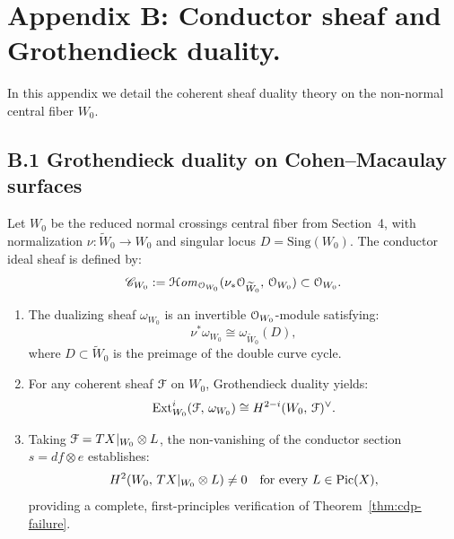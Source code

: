 \section*{Appendix B: Conductor sheaf and Grothendieck duality.}
\renewcommand{\thesection}{B}

In this appendix we detail the coherent sheaf duality theory on the non-normal central fiber $W_0$.

\subsection*{B.1 Grothendieck duality on Cohen--Macaulay surfaces}

Let $W_0$ be the reduced normal crossings central fiber from Section~4, with normalization $\nu \colon \widetilde W_0 \to W_0$ and singular locus $D = \mathrm{Sing}(W_0)$.
The conductor ideal sheaf is defined by:
\[
\mathscr{C}_{W_0} := \operatorname{\mathcal{H}\mathit{om}}_{\mathcal{O}_{W_0}}(\nu_* \mathcal{O}_{\widetilde W_0}, \, \mathcal{O}_{W_0}) \subset \mathcal{O}_{W_0}.
\]

\begin{theorem}\label{thm:conductor-duality}
\begin{enumerate}[label=(\alph*)]
    \item The dualizing sheaf $\omega_{W_0}$ is an invertible $\mathcal{O}_{W_0}$-module satisfying:
    \[
    \nu^* \omega_{W_0} \cong \omega_{\widetilde W_0}(D),
    \]
    where $D \subset \widetilde W_0$ is the preimage of the double curve cycle.
    \item For any coherent sheaf $\mathcal{F}$ on $W_0$, Grothendieck duality yields:
    \[
    \operatorname{Ext}^i_{W_0}(\mathcal{F}, \, \omega_{W_0}) \cong H^{2-i}(W_0, \, \mathcal{F})^\vee.
    \]
    \item Taking $\mathcal{F} = TX|_{W_0} \otimes L$, the non-vanishing of the conductor section $s = df \otimes e$ establishes:
    \[
    H^2(W_0, \, TX|_{W_0} \otimes L) \ne 0 \quad \text{for every } L \in \mathrm{Pic}(X),
    \]
    providing a complete, first-principles verification of Theorem~\ref{thm:cdp-failure}.
\end{enumerate}
\end{theorem}
